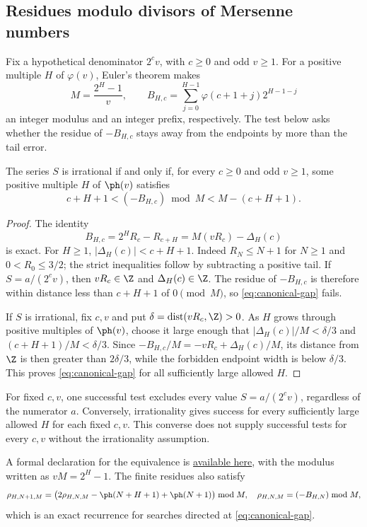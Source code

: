 \subsection{Residues modulo divisors of Mersenne numbers}\label{long249:r3-mersenne}
Fix a hypothetical denominator $2^cv$, with $c\ge0$ and odd $v\ge1$.
For a positive multiple $H$ of $\varphi(v)$, Euler's theorem makes
\[
 M=\frac{2^H-1}{v},\qquad
 B_{H,c}=\sum_{j=0}^{H-1}\varphi(c+1+j)2^{H-1-j}
\]
an integer modulus and an integer prefix, respectively. The test below
asks whether the residue of $-B_{H,c}$ stays away from the endpoints
by more than the tail error.

\begin{equivform}\label{res:canonicalmersenne}
The series $S$ is irrational if and only if, for every $c\ge0$ and odd
$v\ge1$, some positive multiple $H$ of $\ph(v)$ satisfies
\begin{equation}\label{eq:canonical-gap}
 c+H+1<(-B_{H,c})\bmod M<M-(c+H+1).
\end{equation}
\end{equivform}
\begin{proof}
The identity
\[
 B_{H,c}=2^HR_c-R_{c+H}=M(vR_c)-\Delta_H(c)
\]
is exact. For $H\ge1$, $|\Delta_H(c)|<c+H+1$. Indeed $R_N\le N+1$
for $N\ge1$ and $0<R_0\le3/2$; the strict inequalities follow by subtracting
a positive tail. If $S=a/(2^cv)$, then $vR_c\in\Z$ and
$\Delta_H(c)\in\Z$. The residue of $-B_{H,c}$ is therefore within distance
less than $c+H+1$ of $0\pmod M$, so \eqref{eq:canonical-gap} fails.

If $S$ is irrational, fix $c,v$ and put
$\delta=\operatorname{dist}(vR_c,\Z)>0$. As $H$ grows through positive
multiples of $\ph(v)$, choose it large enough that
$|\Delta_H(c)|/M<\delta/3$ and $(c+H+1)/M<\delta/3$.
Since $-B_{H,c}/M=-vR_c+\Delta_H(c)/M$, its distance from $\Z$
is then greater than $2\delta/3$, while the forbidden endpoint
width is below $\delta/3$. This proves \eqref{eq:canonical-gap}
for all sufficiently large allowed $H$.
\end{proof}
For fixed $c,v$, one successful test excludes every value
$S=a/(2^cv)$, regardless of the numerator $a$. Conversely,
irrationality gives success for every sufficiently large allowed $H$
for each fixed $c,v$. This converse does not supply successful tests
for every $c,v$ without the irrationality assumption.

A formal declaration for the equivalence is
\href{https://github.com/wcook04/plectis-erdos/blob/c91562bd574a387cde904481e609c7b4cacebb14/lean/ErdosProblems/Erdos249/CyclotomicAnchoredKill.lean\#L3165}{available here},
with the modulus written as $vM=2^H-1$.
The finite residues also satisfy
\[
 \rho_{H,N+1,M}=
 \bigl(2\rho_{H,N,M}-\ph(N+H+1)+\ph(N+1)\bigr)\bmod M,
 \quad \rho_{H,N,M}=(-B_{H,N})\bmod M,
\]
which is an exact recurrence for searches directed at \eqref{eq:canonical-gap}.


